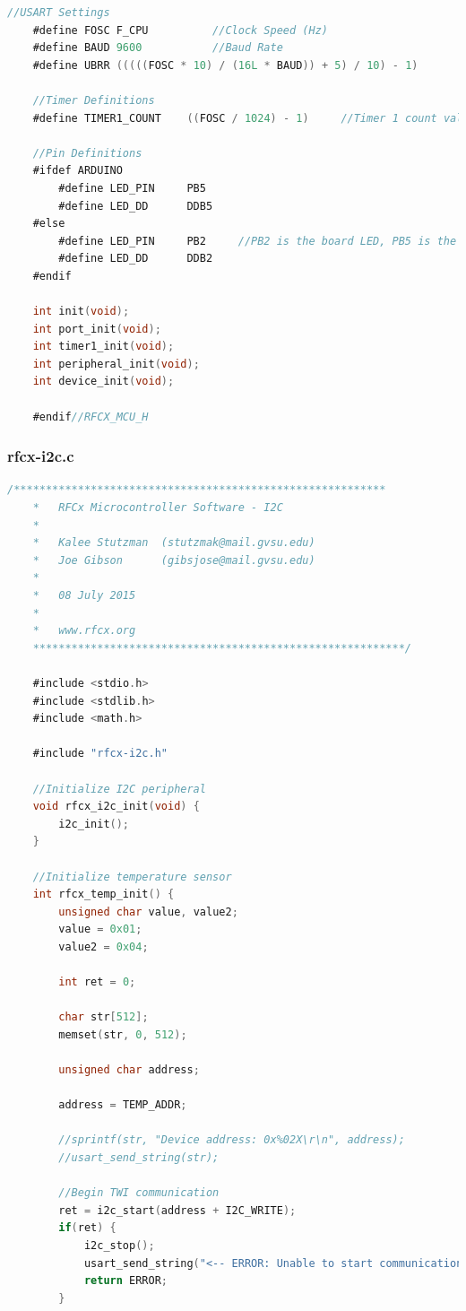 \documentclass{article}
\numberwithin{figure}{section}
\numberwithin{equation}{section}
\begin{document}
{\begin{lstlisting}[language=C,label=lst:rfcx-mcu.h,caption=rfcx-mcu.h]
    //USART Settings
    #define FOSC F_CPU          //Clock Speed (Hz)
    #define BAUD 9600           //Baud Rate
    #define UBRR (((((FOSC * 10) / (16L * BAUD)) + 5) / 10) - 1)

    //Timer Definitions
    #define TIMER1_COUNT    ((FOSC / 1024) - 1)     //Timer 1 count value for CTC mode: 1 second, at 1024 prescaler

    //Pin Definitions
    #ifdef ARDUINO
        #define LED_PIN     PB5
        #define LED_DD      DDB5
    #else
        #define LED_PIN     PB2     //PB2 is the board LED, PB5 is the Arduino LED
        #define LED_DD      DDB2
    #endif

    int init(void);
    int port_init(void);
    int timer1_init(void);
    int peripheral_init(void);
    int device_init(void);

    #endif//RFCX_MCU_H
\end{lstlisting}

\subsubsection{rfcx-i2c.c}\label{sect:rfcx-i2c.c}
\begin{lstlisting}[language=C,label=lst:rfcx-i2c.c,caption=rfcx-i2c.c]
    /**********************************************************
    *	RFCx Microcontroller Software - I2C
    *
    *	Kalee Stutzman 	(stutzmak@mail.gvsu.edu)
    *	Joe Gibson		(gibsjose@mail.gvsu.edu)
    *
    *	08 July 2015
    *
    *   www.rfcx.org
    **********************************************************/

    #include <stdio.h>
    #include <stdlib.h>
    #include <math.h>

    #include "rfcx-i2c.h"

    //Initialize I2C peripheral
    void rfcx_i2c_init(void) {
        i2c_init();
    }

    //Initialize temperature sensor
    int rfcx_temp_init() {
        unsigned char value, value2;
        value = 0x01;
        value2 = 0x04;

        int ret = 0;

        char str[512];
        memset(str, 0, 512);

        unsigned char address;

        address = TEMP_ADDR;

        //sprintf(str, "Device address: 0x%02X\r\n", address);
        //usart_send_string(str);

        //Begin TWI communication
        ret = i2c_start(address + I2C_WRITE);
        if(ret) {
            i2c_stop();
            usart_send_string("<-- ERROR: Unable to start communication-->\r\n");
            return ERROR;
        }


\end{lstlisting}}
\end{document}
